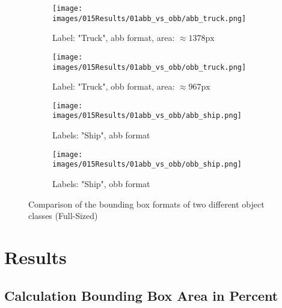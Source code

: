 \begin{figure}[h]
    \centering
    
    \begin{subfigure}[b]{0.45\textwidth}
        \centering
        \texttt{[image: images/015Results/01abb\_vs\_obb/abb\_truck.png]}
        \caption{Label: "Truck", abb format, area: $\approx 1378 \text{px}$}
        \label{fig:abb_truck_fs}
    \end{subfigure}
    \hfill
    \begin{subfigure}[b]{0.45\textwidth}
        \centering
        \texttt{[image: images/015Results/01abb\_vs\_obb/obb\_truck.png]}
        \caption{Label: "Truck", obb format, area: $\approx 967 \text{px}$}
        \label{fig:obb_truck_fs}
    \end{subfigure}
    
    \vspace{0.5cm} %
    
    \begin{subfigure}[b]{0.45\textwidth}
        \centering
        \texttt{[image: images/015Results/01abb\_vs\_obb/abb\_ship.png]}
        \caption{Labels: "Ship", abb format}
        \label{fig:abb_ship_fs}
    \end{subfigure}
    \hfill
    \begin{subfigure}[b]{0.45\textwidth}
        \centering
        \texttt{[image: images/015Results/01abb\_vs\_obb/obb\_ship.png]}
        \caption{Labels: "Ship", obb format}
        \label{fig:obb_ship_fs}
    \end{subfigure}  
    \caption{Comparison of the bounding box formats of two different object classes (Full-Sized)}
    \label{fig:comparison_bb_format_fs}
\end{figure}


\FloatBarrier

\FloatBarrier

\FloatBarrier

\FloatBarrier
\clearpage

\section{Results}
\subsection{Calculation Bounding Box Area in Percent}
\label{ap:calc_bb_area_percent}

